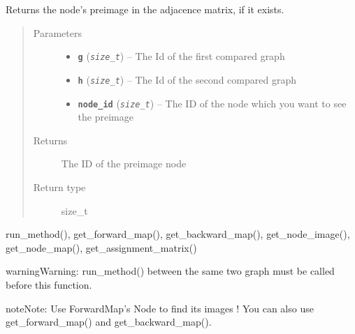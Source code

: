 \documentclass[letterpaper,10pt,english]{sphinxmanual}
\begin{document}
\begin{fulllineitems}
\label{doc:gedlibpy.get_node_pre_image}
Returns the node's preimage in the adjacence matrix, if it exists.
\begin{quote}\begin{description}
\item[{Parameters}] \leavevmode\begin{itemize}
\item {} 
\textbf{\texttt{g}} (\emph{\texttt{size\_t}}) -- The Id of the first compared graph

\item {} 
\textbf{\texttt{h}} (\emph{\texttt{size\_t}}) -- The Id of the second compared graph

\item {} 
\textbf{\texttt{node\_id}} (\emph{\texttt{size\_t}}) -- The ID of the node which you want to see the preimage

\end{itemize}

\item[{Returns}] \leavevmode
The ID of the preimage node

\item[{Return type}] \leavevmode
size\_t

\end{description}\end{quote}




run\_method(), get\_forward\_map(), get\_backward\_map(), get\_node\_image(), get\_node\_map(), get\_assignment\_matrix()



\begin{notice}{warning}{Warning:}
run\_method() between the same two graph must be called before this function.
\end{notice}

\begin{notice}{note}{Note:}
Use ForwardMap's Node to find its images ! You can also use get\_forward\_map() and get\_backward\_map().
\end{notice}

\end{fulllineitems}

\end{document}
